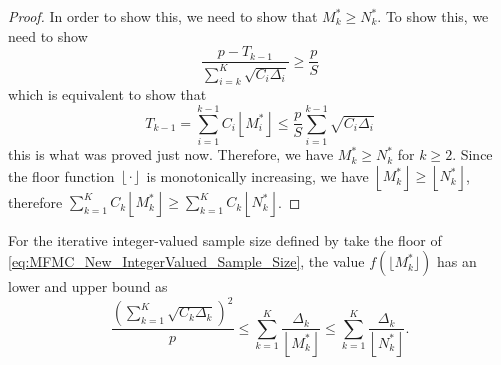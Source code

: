 \begin{proof}
In order to show this, we need to show that $M_k^*\ge N_k^*$. To show this, we need to show
\[
\frac{p-T_{k-1}}{\sum_{i=k}^K\sqrt{C_i\Delta_i}}\ge \frac{p}{S}
\]
which is equivalent to show that
\[
T_{k-1}=\sum_{i=1}^{k-1}C_i\left\lfloor M_i^*\right\rfloor\le \frac{p}{S}\sum_{i=1}^{k-1}\sqrt{C_i\Delta_i}
\]
this is what was proved just now. Therefore, we have $M_k^*\ge N_k^*$ for $k\ge 2$. Since the floor function $\left\lfloor\cdot \right\rfloor$ is monotonically increasing, we have $\left\lfloor M_k^* \right\rfloor \ge \left\lfloor N_k^* \right\rfloor$, therefore $\sum_{k=1}^K C_k\left\lfloor M_k^* \right\rfloor\ge \sum_{k=1}^K C_k\left\lfloor N_k^* \right\rfloor$.



\end{proof}



\begin{theorem}\label{thm:MFMC_New_IntegerValued_Variance}

For the iterative integer-valued sample size defined by take the floor of \eqref{eq:MFMC_New_IntegerValued_Sample_Size}, the value $f(\lfloor M_k^* \rfloor)$ has an lower and upper bound as
\[
\frac{\left(\sum_{k=1}^K\sqrt{C_k\Delta_k}\right)^2}{p}\le \sum_{k=1}^K \frac{\Delta_k}{\left\lfloor M_k^* \right\rfloor}\le \sum_{k=1}^K \frac{\Delta_k}{\left\lfloor N_k^* \right\rfloor}.
\]
\end{theorem}

